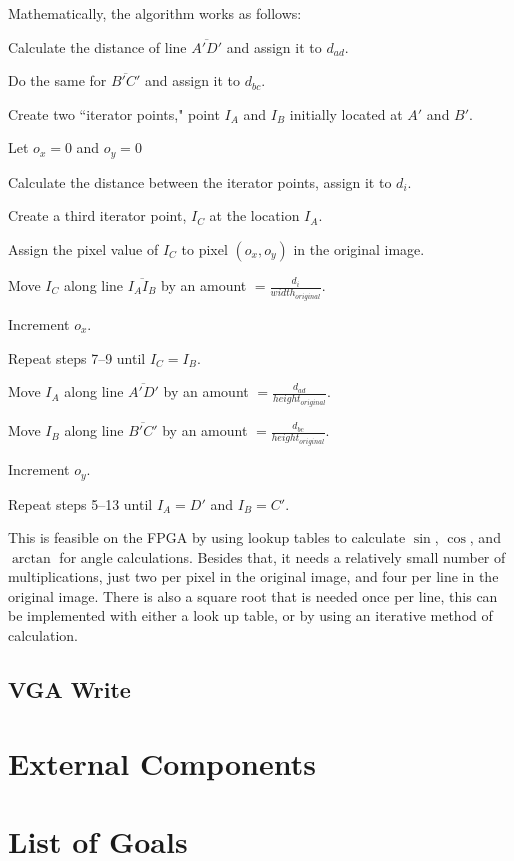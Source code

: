 \documentclass[10pt]{article}
\begin{document}
Mathematically, the algorithm works as follows:
\begin{enumerate*}
\item Calculate the distance of line $\overline{A\prime D\prime}$ and assign it to $d_{ad}$.
\item Do the same for $\overline{B\prime C\prime}$ and assign it to $d_{bc}$.
\item Create two ``iterator points," point $I_A$ and $I_B$ initially located at $A\prime$ and $B\prime$.
\item Let $o_x = 0$ and $o_y = 0$
\item Calculate the distance between the iterator points, assign it to $d_i$.
\item Create a third iterator point, $I_C$ at the location $I_A$.
\item Assign the pixel value of $I_C$ to pixel $(o_x, o_y)$ in the original image.
\item Move $I_C$ along line $\overline{I_A I_B}$ by an amount $= \frac{d_i}{width_{original}}$.
\item Increment $o_x$.
\item Repeat steps 7--9 until $I_C = I_B$.
\item Move $I_A$ along line $\overline{A\prime D\prime}$ by an amount $= \frac{d_{ad}}{height_{original}}$.
\item Move $I_B$ along line $\overline{B\prime C\prime}$ by an amount $= \frac{d_{bc}}{height_{original}}$.
\item Increment $o_y$.
\item Repeat steps 5--13 until $I_A = D\prime$ and $I_B = C\prime$.
\end{enumerate*}


This is feasible on the FPGA by using lookup tables to calculate $\sin$, $\cos$, and $\arctan$ for angle calculations. Besides that, it needs a relatively small number of multiplications, just two per pixel in the original image, and four per line in the original image. There is also a square root that is needed once per line, this can be implemented with either a look up table, or by using an iterative method of calculation.

\subsection{VGA Write}

\section{External Components}

\section{List of Goals}
\end{document}
